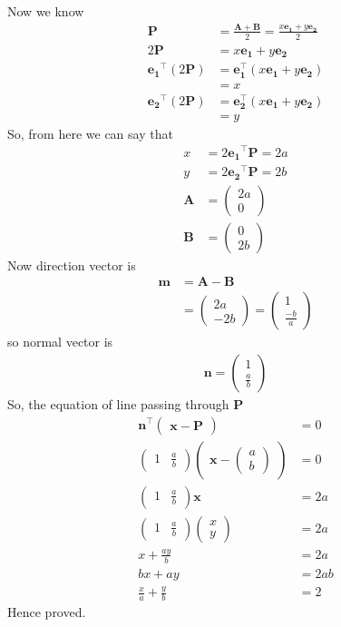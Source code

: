 \documentclass[12pt]{article}
\providecommand{\brak}[1]{\ensuremath{\left(#1\right)}}
\newcommand{\myvec}[1]{\ensuremath{\begin{pmatrix}#1\end{pmatrix}}}
\let\vec\mathbf
\begin{document}
Now we know
\begin{align}
	\vec{P}&=\frac{\vec{A}+\vec{B}}{2}=\frac{x\vec{e_{1}}+y\vec{e_{2}}}{2}\\
	2\vec{P}&=x\vec{e_{1}}+y\vec{e_{2}}\\
	\vec{e_{1}}^{\top}\brak{2\vec{P}}&=\vec{e_{1}^{\top}}\brak{x\vec{e_{1}}+y\vec{e_{2}}}\\
					 &=x\\				 
	\vec{e_{2}}^{\top}\brak{2\vec{P}}&=\vec{e_{2}^{\top}}\brak{x\vec{e_{1}}+y\vec{e_{2}}}\\
					 &=y				 
\end{align}
So, from here we can say that
\begin{align}
	x&=2\vec{e_{1}}^{\top}\vec{P}=2a\\
	y&=2\vec{e_{2}}^{\top}\vec{P}=2b\\
	\vec{A} &= \myvec{2a\\0}\\
	\vec{B} &= \myvec{0\\2b}
\end{align}
Now direction vector is
\begin{align}
	\vec{m} &= \vec{A}-\vec{B}\\
		&= \myvec{2a\\-2b} = \myvec{1\\\frac{-b}{a}}
\end{align}
so normal vector is
\begin{align}
	\vec{n} = \myvec{1\\\frac{a}{b}}
\end{align}
So, the equation of line passing through $\vec{P}$
\begin{align}
	\vec{n}^{\top} \myvec{\vec{x}-\vec{P}} &= 0\\
	\myvec{1 & \frac{a}{b}}\myvec{\vec{x}-\myvec{a\\b}}&=0\\
	\myvec{1 & \frac{a}{b}}\vec{x}&=2a\\
	\myvec{1 & \frac{a}{b}}\myvec{x\\y}&=2a\\
	x+\frac{ay}{b}&=2a\\
	bx+ay&=2ab\\
	\frac{x}{a}+\frac{y}{b}&=2
\end{align}
Hence proved.
\end{document}

